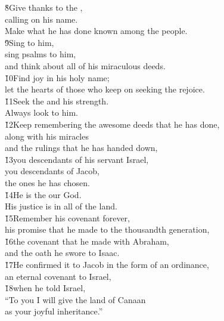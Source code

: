 \begin{poetry}
\poeml \v{8}Give thanks to the , \\
\poemll    calling on his name. \\
\poemlll       Make what he has done known among the people. \\
\poeml \v{9}Sing to him, \\
\poemll    sing psalms to him, \\
\poemlll       and think about all of his miraculous deeds. \\
\poeml \v{10}Find joy in his holy name; \\
\poemll    let the hearts of those who keep on seeking the  rejoice. \\
\poeml \v{11}Seek the  and his strength. \\
\poemll    Always look to him. \\
\poeml \v{12}Keep remembering the awesome deeds that he has done, \\
\poemll    along with his miracles \\
\poemlll       and the rulings that he has handed down, \\
\poeml \v{13}you descendants of his servant Israel, \\
\poemll    you descendants of Jacob, \\
\poemlll       the ones he has chosen. \\
\poeml \v{14}He is the  our God. \\
\poemll    His justice is in all of the land. \\
\poeml \v{15}Remember his covenant forever, \\
\poemll    his promise that he made to the thousandth generation, \\
\poeml \v{16}the covenant that he made with Abraham, \\
\poemll    and the oath he swore to Isaac. \\
\poeml \v{17}He confirmed it to Jacob in the form of an ordinance, \\
\poemll    an eternal covenant to Israel, \\
\poeml \v{18}when he told Israel, \\
\poemll    ``To you I will give the land of Canaan \\
\poemlll       as your joyful inheritance.'' \\

\end{poetry}
